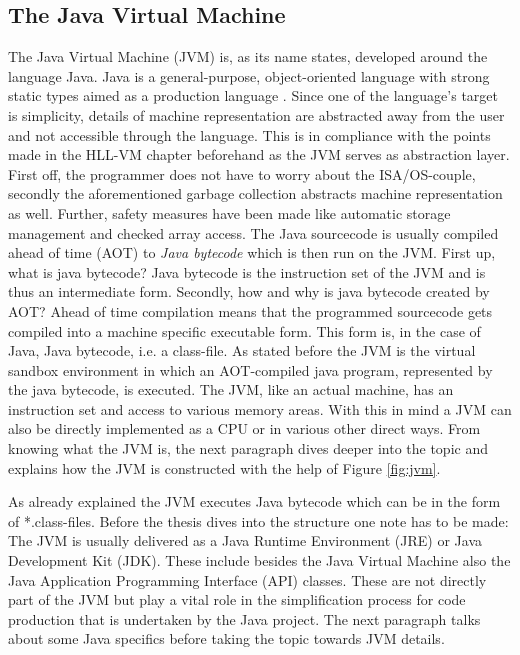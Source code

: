 \subsection{The Java Virtual Machine}
\label{sec:JVM}
The Java Virtual Machine (JVM) is, as its name states, developed around the language Java. Java is a general-purpose, object-oriented language with strong static types aimed as a production language \cite{Gosling}. Since one of the language's target is simplicity, details of machine representation are abstracted away from the user and not accessible through the language. This is in compliance with the points made in the HLL-VM chapter beforehand as the JVM serves as abstraction layer. First off, the programmer does not have to worry about the ISA/OS-couple, secondly the aforementioned garbage collection abstracts machine representation as well. Further, safety measures have been made like automatic storage management and checked array access. The Java sourcecode is usually compiled ahead of time (AOT) to \emph{Java bytecode} which is then run on the JVM. First up, what is java bytecode? Java bytecode is the instruction set of the JVM and is thus an intermediate form. Secondly, how and why is java bytecode created by AOT? Ahead of time compilation means that the programmed sourcecode gets compiled into a machine specific executable form. This form is, in the case of Java, Java bytecode, i.e. a class-file\cite{Gosling}. As stated before the JVM is the virtual sandbox environment in which an AOT-compiled java program, represented by the java bytecode, is executed. The JVM, like an actual machine, has an instruction set and access to various memory areas. With this in mind a JVM can also be directly implemented as a CPU or in various other direct ways. From knowing what the JVM is, the next paragraph dives deeper into the topic and explains how the JVM is constructed with the help of Figure \ref{fig:jvm}.

As already explained the JVM executes Java bytecode which can be in the form of *.class-files. Before the thesis dives into the structure one note has to be made: The JVM is usually delivered as a Java Runtime Environment (JRE) or Java Development Kit (JDK). These include besides the Java Virtual Machine also the Java Application Programming Interface (API) classes. These are not directly part of the JVM but play a vital role in the simplification process for code production that is undertaken by the Java project. The next paragraph talks about some Java specifics before taking the topic towards JVM details.

